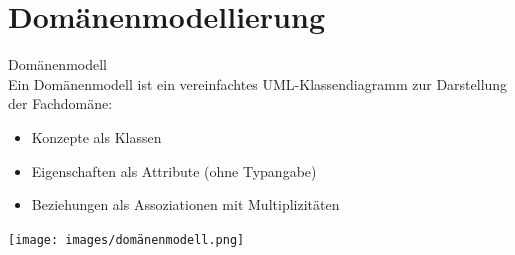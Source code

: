 \section{Domänenmodellierung}

\begin{definition}{Domänenmodell}\\
Ein Domänenmodell ist ein vereinfachtes UML-Klassendiagramm zur Darstellung der Fachdomäne:
\begin{itemize}
    \item Konzepte als Klassen
    \item Eigenschaften als Attribute (ohne Typangabe)
    \item Beziehungen als Assoziationen mit Multiplizitäten
\end{itemize}
\texttt{[image: images/domänenmodell.png]}
\end{definition}





